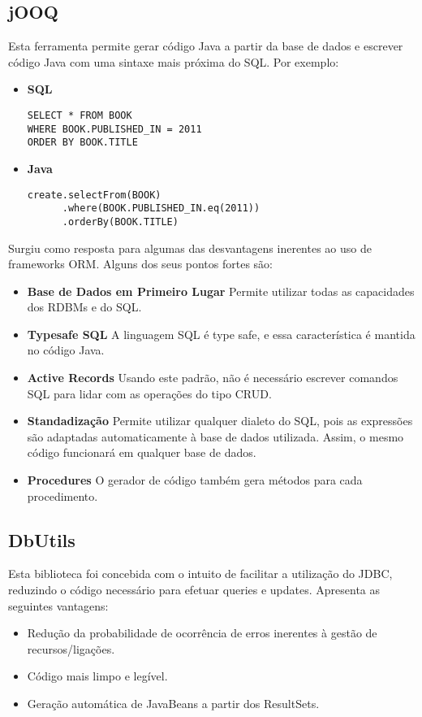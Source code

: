 \subsection{jOOQ}
Esta ferramenta permite gerar código Java a partir da base de dados e escrever código Java com uma sintaxe mais próxima do SQL. Por exemplo:\par
\begin{itemize}
\item \textbf{SQL}
\begin{verbatim}
SELECT * FROM BOOK
WHERE BOOK.PUBLISHED_IN = 2011
ORDER BY BOOK.TITLE
\end{verbatim}
\item \textbf{Java}
\begin{verbatim}
create.selectFrom(BOOK)
      .where(BOOK.PUBLISHED_IN.eq(2011))
      .orderBy(BOOK.TITLE)
\end{verbatim}
\end{itemize}
Surgiu como resposta para algumas das desvantagens inerentes ao uso de frameworks ORM. Alguns dos seus pontos fortes são:
\begin{itemize}
\item \textbf{Base de Dados em Primeiro Lugar} Permite utilizar todas as capacidades dos RDBMs e do SQL.
\item \textbf{Typesafe SQL} A linguagem SQL é type safe, e essa característica é mantida no código Java.
\item \textbf{Active Records} Usando este padrão, não é necessário escrever comandos SQL para lidar com as operações do tipo CRUD.
\item \textbf{Standadização} Permite utilizar qualquer dialeto do SQL, pois as expressões são adaptadas automaticamente à base de dados utilizada. Assim, o mesmo código funcionará em qualquer base de dados.
\item \textbf{Procedures} O gerador de código também gera métodos para cada procedimento.
\end{itemize}
\subsection{DbUtils}
Esta biblioteca foi concebida com o intuito de facilitar a utilização do JDBC, reduzindo o código necessário para efetuar queries e updates. Apresenta as seguintes vantagens:
\begin{itemize}
\item Redução da probabilidade de ocorrência de erros inerentes à gestão de recursos/ligações.
\item Código mais limpo e legível.
\item Geração automática de JavaBeans a partir dos ResultSets.
\end{itemize}
